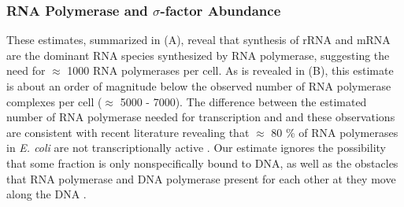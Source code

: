 \begin{figure}
    \begin{fullwidth}
    \end{fullwidth}
\end{figure}


\subsubsection{RNA Polymerase and $\sigma$-factor Abundance}
These estimates, summarized in  (A), reveal that synthesis of
rRNA  and mRNA are the dominant RNA species synthesized by RNA polymerase,
suggesting the need for $\approx$ 1000 RNA polymerases per cell. As is revealed
in  (B), this estimate is about an order of magnitude below
the observed number of RNA polymerase complexes per cell ($\approx$ 5000 -
7000). The difference between the estimated number of RNA polymerase needed for
transcription and and
these observations are consistent with recent literature revealing that
$\approx$ 80 \% of RNA polymerases in \textit{E. coli} are not transcriptionally
active \citep{patrick2015}. Our estimate ignores the possibility that some
fraction is only nonspecifically bound to DNA, as well as the obstacles that RNA
polymerase and DNA polymerase present for each other at they move along the DNA
\citep{finkelstein2013}.

